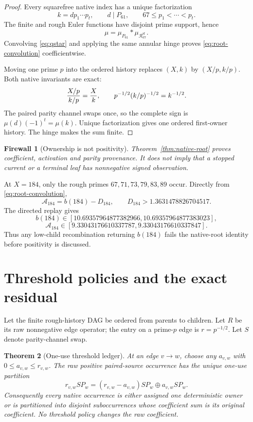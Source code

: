 \documentclass[11pt]{article}
\newtheorem{theorem}{Theorem}[section]
\newtheorem{firewall}[theorem]{Firewall}
\newcommand{\Acal}{\mathcal A}
\newcommand{\Rcal}{\mathcal R}
\begin{document}
\begin{proof}
Every squarefree native index has a unique factorization
\[
 k=d p_1\cdots p_t,
 \qquad d\mid P_{61},
 \qquad67\le p_1<\cdots<p_t.
\]
The finite and rough Euler functions have disjoint prime support, hence
\[
 \mu=\mu_{P_{61}}*\mu_{\Rcal_{67}^{\mathrm{sf}}}.
\]
Convolving \eqref{eq:qstar} and applying the same annular hinge proves
\eqref{eq:root-convolution} coefficientwise.

Moving one prime $p$ into the ordered history replaces $(X,k)$ by
$(X/p,k/p)$.  Both native invariants are exact:
\[
 {X/p\over k/p}={X\over k},
 \qquad
 p^{-1/2}(k/p)^{-1/2}=k^{-1/2}.
\]
The paired parity channel swaps once, so the complete sign is
$\mu(d)(-1)^t=\mu(k)$.  Unique factorization gives one ordered first-owner
history.  The hinge makes the sum finite.
\end{proof}

\begin{firewall}[Ownership is not positivity]
Theorem~\ref{thm:native-root} proves coefficient, activation and parity
provenance.  It does not imply that a stopped current or a terminal leaf has
nonnegative signed observation.
\end{firewall}

At $X=184$, only the rough primes $67,71,73,79,83,89$ occur.  Directly from
\eqref{eq:root-convolution},
\[
 \Acal_{184}=b(184)-D_{184},
 \qquad
 D_{184}>1.3631478826704517.
\]
The directed replay gives
\[
 b(184)\in[10.69357964877382966,10.69357964877383023],
\]
\[
 \Acal_{184}\in[9.33043176610337787,9.33043176610337847].
\]
Thus any low-child recombination returning $b(184)$ fails the native-root
identity before positivity is discussed.

\section{Threshold policies and the exact residual}

Let the finite rough-history DAG be ordered from parents to children.  Let $R$
be its raw nonnegative edge operator; the entry on a prime-$p$ edge is
$r=p^{-1/2}$.  Let $S$ denote parity-channel swap.

\begin{theorem}[One-use threshold ledger]\label{thm:threshold-ledger}
At an edge $v\to w$, choose any $a_{v,w}$ with
$0\le a_{v,w}\le r_{v,w}$.  The raw positive paired-source occurrence has the
unique one-use partition
\begin{equation}\label{eq:edge-split}
 r_{v,w}SP_w
 =(r_{v,w}-a_{v,w})SP_w\oplus a_{v,w}SP_w.
\end{equation}
Consequently every native occurrence is either assigned one deterministic
owner or is partitioned into disjoint suboccurrences whose coefficient sum is
its original coefficient.  No threshold policy changes the raw coefficient.
\end{theorem}
\end{document}
